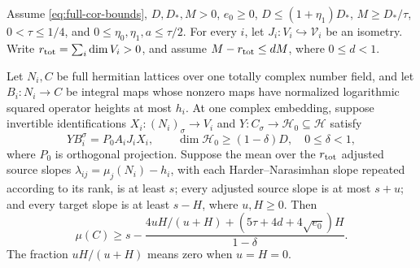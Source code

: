 \begin{proposition}\label{prop:direct-gram-slope}
Assume \eqref{eq:full-cor-bounds}, $D,D_*,M>0$, $e_0\ge0$,
$D\le(1+\eta_1)D_*$, $M\ge D_*/\tau$,
$0<\tau\le1/4$, and $0\le\eta_0,\eta_1,a\le\tau/2$.
For every $i$, let $J_i:V_i\hookrightarrow\mathcal V_i$ be an isometry.
Write $r_{\rm tot}=\sum_i\dim V_i>0$, and assume $M-r_{\rm tot}\le dM$, where $0\le d<1$.

Let $N_i,C$ be full hermitian lattices over one totally complex number field,
and let $B_i:N_i\to C$ be integral maps whose nonzero maps have normalized
logarithmic squared operator heights at most $h_i$.
At one complex embedding, suppose invertible identifications
$X_i:(N_i)_\sigma\to V_i$ and $Y:C_\sigma\to\mathcal H_0\subseteq\mathcal H$
satisfy
\[
YB_i^\sigma=P_0A_iJ_iX_i,\qquad
\dim\mathcal H_0\ge(1-\delta)D,\quad 0\le\delta<1,
\]
where $P_0$ is orthogonal projection.  Suppose the mean over the $r_{\rm tot}$
adjusted source slopes $\lambda_{ij}=\mu_j(N_i)-h_i$, with each
Harder--Narasimhan slope repeated according to its rank, is at least $s$;
every adjusted source slope is at most $s+u$; and every target slope is
at least $s-H$, where $u,H\ge0$.  Then
\begin{equation}\label{eq:direct-gram-slope}
\mu(C)\ge s-
\frac{4uH/(u+H)+(5\tau+4d+4\sqrt{e_0})H}{1-\delta}.
\end{equation}
The fraction $uH/(u+H)$ means zero when $u=H=0$.
\end{proposition}

